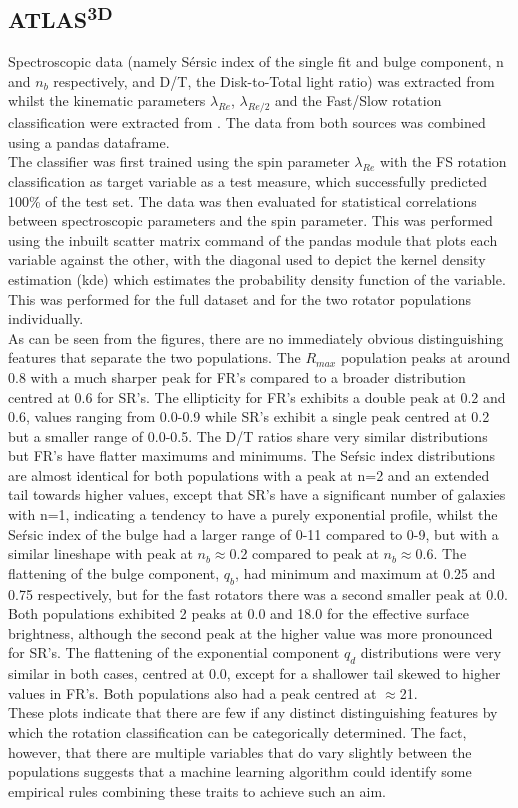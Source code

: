 \subsection{ATLAS\textsuperscript{3D}}
Spectroscopic data (namely S\'ersic index of the single fit and bulge component, n and $n_{b}$ respectively,  and D/T, the Disk-to-Total light ratio) was extracted from \cite{Krajnovic2013} whilst the kinematic parameters $\lambda_{Re}$, $\lambda_{Re/2}$ and the Fast/Slow rotation classification were extracted from \cite{Emsellem2011}. The data from both sources was combined using a pandas dataframe.\\
The classifier was first trained using the spin parameter $\lambda_{Re}$ with the FS rotation classification as target variable as a test measure, which successfully predicted 100\% of the test set. The data was then evaluated for statistical correlations between spectroscopic parameters and the spin parameter. This was performed using the inbuilt scatter matrix command of the pandas module that plots each variable against the other, with the diagonal used to depict the kernel density estimation (kde) which estimates the probability density function of the variable. This was performed for the full dataset and for the two rotator populations individually.\\As can be seen from the figures, there are no immediately obvious distinguishing features that separate the two populations. The $R_{max}$ population peaks at around 0.8 with a much sharper peak for FR's compared to a broader distribution centred at 0.6 for SR's. The ellipticity for FR's exhibits a double peak at 0.2 and 0.6, values ranging from 0.0-0.9 while SR's exhibit a single peak centred at 0.2 but a smaller range of 0.0-0.5. The D/T ratios share very similar distributions but FR's have flatter maximums and minimums. The Se\'rsic index distributions are almost identical for both populations with a peak at n=2 and an extended tail towards higher values, except that SR's have a significant number of galaxies with n=1, indicating a tendency to have a purely exponential profile, whilst the Se\'rsic index of the bulge had a larger range of 0-11 compared to 0-9, but with a similar lineshape with peak at $n_{b}\approx$0.2 compared to peak at $n_{b}\approx$0.6. The flattening of the bulge component, $q_{b}$, had minimum and maximum at 0.25 and 0.75 respectively, but for the fast rotators there was a second smaller peak at 0.0. Both populations exhibited 2 peaks at 0.0 and 18.0 for the effective surface brightness, although the second peak at the higher value was more pronounced for SR's. The flattening of the exponential component $q_{d}$ distributions were very similar in both cases, centred at 0.0, except for a shallower tail skewed to higher values in FR's. Both populations also had a peak centred at $\approx$21. \\
These plots indicate that there are few if any distinct distinguishing features by which the rotation classification can be categorically determined. The fact, however, that there are multiple variables that do vary slightly between the populations suggests that a machine learning algorithm could identify some empirical rules combining these traits to achieve such an aim.

